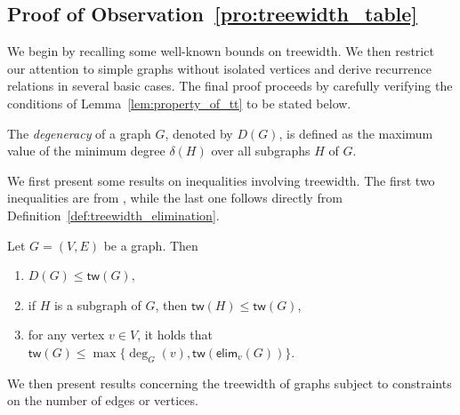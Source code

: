\documentclass[twoside,11pt]{article}
\newcommand{\degp}[2]{\deg_{#2}(#1)}
\newcommand{\treewidthp}[1]{\mathsf{tw}(#1)}
\newcommand{\degeneracy}{D}
\newcommand{\degeneracyg}[1]{\degeneracy(#1)}
\newcommand{\eliminatevg}[2]{\mathsf{elim}_{#1}(#2)}
\begin{document}
\subsection{Proof of Observation~\ref{pro:treewidth_table}}
\label{app:treewidtg_table}

We begin by recalling some well-known bounds on treewidth. We then restrict our attention to simple graphs without isolated vertices and derive recurrence relations in several basic cases. The final proof proceeds by carefully verifying the conditions of Lemma~\ref{lem:property_of_tt} to be stated below.

\begin{definition}[Degeneracy]
\label{def:degeracy}
The \emph{degeneracy} of a graph $G$, denoted by $\degeneracyg{G}$, is defined as the maximum value of the minimum degree $\delta(H)$ over all subgraphs $H$ of $G$.
\end{definition}

We first present some results on inequalities involving treewidth. The first two inequalities are from \citet{bodlaender2011treewidth}, while the last one follows directly from Definition~\ref{def:treewidth_elimination}.

\begin{lemma}
\label{lem:simple_bounds_on_treewidth}
Let $G = (V, E)$ be a graph. Then
\begin{enumerate}
    \item $ \degeneracyg{G} \leq \treewidthp{G},$
    
    \item if $H$ is a subgraph of $G$, then $\treewidthp{H} \leq \treewidthp{G}$, 
    
    \item for any vertex $v \in V$, it holds that $\treewidthp{G} \leq \max \{\degp{v}{G}, \treewidthp{\eliminatevg{v}{G}} \}$.
\end{enumerate}
\end{lemma}

We then present results concerning the treewidth of graphs subject to constraints on the number of edges or vertices.
\end{document}
